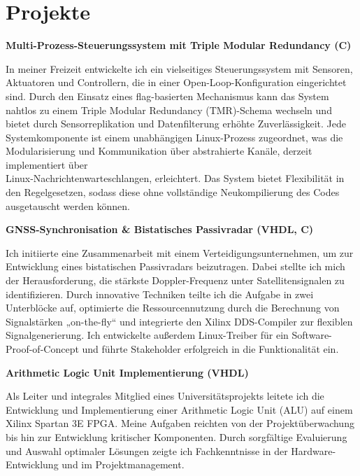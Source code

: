 \documentclass[letterpaper]{twentysecondcv} %
\begin{document}
\section{Projekte}

\textbf{Multi-Prozess-Steuerungssystem mit Triple Modular Redundancy (C)}

In meiner Freizeit entwickelte ich ein vielseitiges Steuerungssystem mit Sensoren, Aktuatoren und Controllern, die in einer Open-Loop-Konfiguration eingerichtet sind. Durch den Einsatz eines flag-basierten Mechanismus kann das System nahtlos zu einem Triple Modular Redundancy (TMR)-Schema wechseln und bietet durch Sensorreplikation und Datenfilterung erhöhte Zuverlässigkeit. Jede Systemkomponente ist einem unabhängigen Linux-Prozess zugeordnet, was die Modularisierung und Kommunikation über abstrahierte Kanäle, derzeit implementiert über \\ Linux-Nachrichtenwarteschlangen, erleichtert. Das System bietet Flexibilität in den Regelgesetzen, sodass diese ohne vollständige Neukompilierung des Codes ausgetauscht werden können.

\textbf{GNSS-Synchronisation \& Bistatisches Passivradar (VHDL, C)}

Ich initiierte eine Zusammenarbeit mit einem Verteidigungsunternehmen, um zur Entwicklung eines bistatischen Passivradars beizutragen. Dabei stellte ich mich der Herausforderung, die stärkste Doppler-Frequenz unter Satellitensignalen zu identifizieren. Durch innovative Techniken teilte ich die Aufgabe in zwei Unterblöcke auf, optimierte die Ressourcennutzung durch die Berechnung von Signalstärken „on-the-fly“ und integrierte den Xilinx DDS-Compiler zur flexiblen Signalgenerierung. Ich entwickelte außerdem Linux-Treiber für ein Software-Proof-of-Concept und führte Stakeholder erfolgreich in die Funktionalität ein.

\textbf{Arithmetic Logic Unit Implementierung (VHDL)}

Als Leiter und integrales Mitglied eines Universitätsprojekts leitete ich die Entwicklung und Implementierung einer Arithmetic Logic Unit (ALU) auf einem Xilinx Spartan 3E FPGA. Meine Aufgaben reichten von der Projektüberwachung bis hin zur Entwicklung kritischer Komponenten. Durch sorgfältige Evaluierung und Auswahl optimaler Lösungen zeigte ich Fachkenntnisse in der Hardware-Entwicklung und im Projektmanagement.
\end{document}

